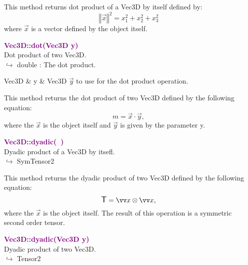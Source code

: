This method returns dot product of a Vec3D by itself defined by:
\begin{equation*}
\left\Vert \overrightarrow{x} \right\Vert^2  = x_{1}^2 + x_{2}^2 + x_{3}^2
\end{equation*}
where $\overrightarrow{x}$ is a vector defined by the object itself.

\textcolor{purple}{\textbf{Vec3D::dot(Vec3D y)}}\label{Vec3D::dot(Vec3D y)}\\
Dot product of two Vec3D.\\ \hspace*{10mm}$\hookrightarrow$ double : The dot product.

\begin{tcolorbox}[width=\textwidth,myArgs,tabularx={ll|R}]
Vec3D & y & Vec3D $\overrightarrow{y}$ to use for the dot product operation.
\end{tcolorbox}

This method returns the dot product of two Vec3D defined by the following equation:
\begin{equation*}
m = \overrightarrow{x}\cdot\overrightarrow{y},
\end{equation*}
where the $\overrightarrow{x}$ is the object itself and $\overrightarrow{y}$ is given by the parameter y.

\textcolor{purple}{\textbf{Vec3D::dyadic(~)}}\label{Vec3D::dyadic()}\\
Dyadic product of a Vec3D by itsefl.\\ \hspace*{10mm}$\hookrightarrow$ SymTensor2

This method returns the dyadic product of two Vec3D defined by the following equation:
\begin{equation*}
\T = \overrightarrow{x}\otimes\overrightarrow{x},
\end{equation*}
where the $\overrightarrow{x}$ is the object itself. The result of this operation is a symmetric second order tensor.

\textcolor{purple}{\textbf{Vec3D::dyadic(Vec3D y)}}\label{Vec3D::dyadic(Vec3D y)}\\
Dyadic product of two Vec3D.\\ \hspace*{10mm}$\hookrightarrow$ Tensor2

